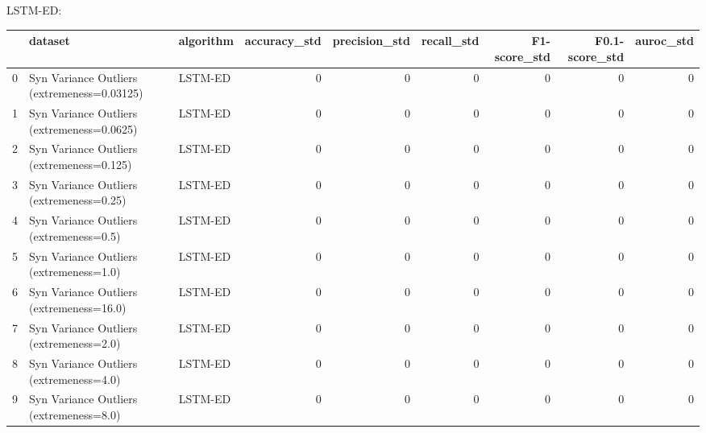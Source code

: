 LSTM-ED:

\begin{tabular}{rllrrrrrr}
\hline
    & dataset                                     & algorithm   &   accuracy\_std &   precision\_std &   recall\_std &   F1-score\_std &   F0.1-score\_std &   auroc\_std \\
\hline
  0 & Syn Variance Outliers (extremeness=0.03125) & LSTM-ED     &              0 &               0 &            0 &              0 &                0 &           0 \\
  1 & Syn Variance Outliers (extremeness=0.0625)  & LSTM-ED     &              0 &               0 &            0 &              0 &                0 &           0 \\
  2 & Syn Variance Outliers (extremeness=0.125)   & LSTM-ED     &              0 &               0 &            0 &              0 &                0 &           0 \\
  3 & Syn Variance Outliers (extremeness=0.25)    & LSTM-ED     &              0 &               0 &            0 &              0 &                0 &           0 \\
  4 & Syn Variance Outliers (extremeness=0.5)     & LSTM-ED     &              0 &               0 &            0 &              0 &                0 &           0 \\
  5 & Syn Variance Outliers (extremeness=1.0)     & LSTM-ED     &              0 &               0 &            0 &              0 &                0 &           0 \\
  6 & Syn Variance Outliers (extremeness=16.0)    & LSTM-ED     &              0 &               0 &            0 &              0 &                0 &           0 \\
  7 & Syn Variance Outliers (extremeness=2.0)     & LSTM-ED     &              0 &               0 &            0 &              0 &                0 &           0 \\
  8 & Syn Variance Outliers (extremeness=4.0)     & LSTM-ED     &              0 &               0 &            0 &              0 &                0 &           0 \\
  9 & Syn Variance Outliers (extremeness=8.0)     & LSTM-ED     &              0 &               0 &            0 &              0 &                0 &           0 \\
\hline
\end{tabular}

